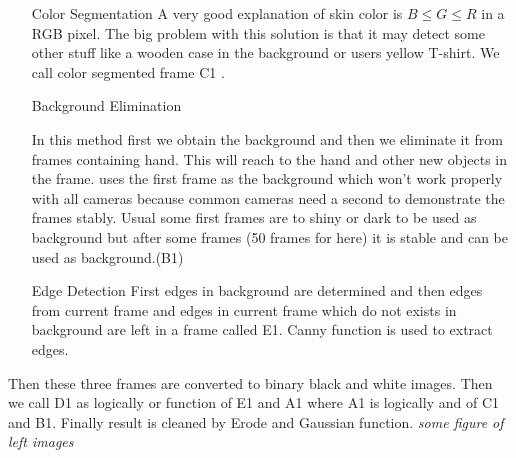 \begin{enumerate}
	\item[Color Segmentation]{A very good explanation of skin color is $B \le G \le R$ \cite{chen2003hand} in a RGB pixel. The big problem with this solution is that it may detect some other stuff like a wooden case in the background or users yellow T-shirt. We call color segmented frame C1 .}
	\item[Background Elimination]{In this method first we obtain the background and then we eliminate it from frames containing hand. This will reach to the hand and other new objects in the frame. \cite{dey2014algorithm} uses the first frame as the background which won't work properly with all cameras because common cameras need a second to demonstrate the frames stably. Usual some first frames are to shiny or dark to be used as background but after some frames (50 frames for here) it is stable and can be used as background.(B1)  
	\begin{figure}
	\end{figure}
	} %
	\item[Edge Detection] {First edges in background are determined and then edges from current frame and edges in current frame which do not exists in background are left in a frame called E1. Canny function is used to extract edges.}
\end{enumerate}
Then these three frames are converted to binary black and white images. Then we call D1 as logically or function of E1 and A1 where A1 is logically and of C1 and B1. Finally result is cleaned by Erode and Gaussian function. 
\textit{some figure of left images}



